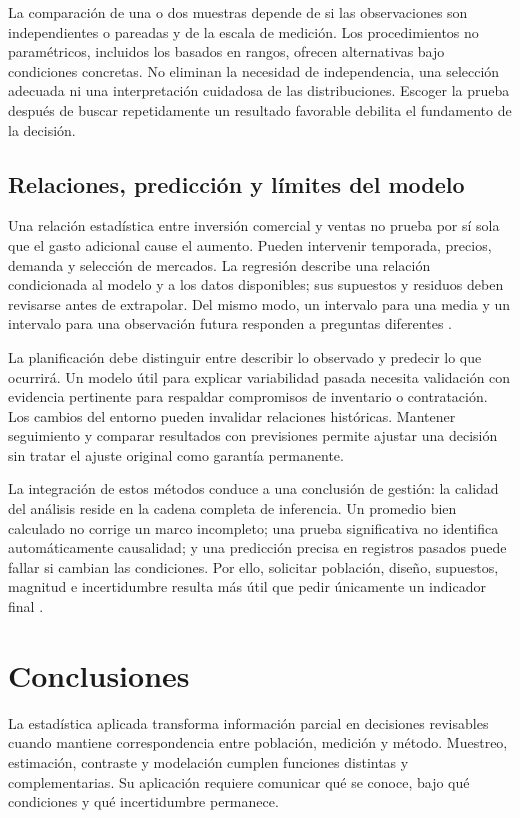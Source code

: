 \documentclass[
	spanish,
	letterpaper, oneside
]{article}
\begin{document}
La comparación de una o dos muestras depende de si las observaciones son independientes o pareadas y de la escala de medición. Los procedimientos no paramétricos, incluidos los basados en rangos, ofrecen alternativas bajo condiciones concretas. No eliminan la necesidad de independencia, una selección adecuada ni una interpretación cuidadosa de las distribuciones. Escoger la prueba después de buscar repetidamente un resultado favorable debilita el fundamento de la decisión.

\subsection{Relaciones, predicción y límites del modelo}
Una relación estadística entre inversión comercial y ventas no prueba por sí sola que el gasto adicional cause el aumento. Pueden intervenir temporada, precios, demanda y selección de mercados. La regresión describe una relación condicionada al modelo y a los datos disponibles; sus supuestos y residuos deben revisarse antes de extrapolar. Del mismo modo, un intervalo para una media y un intervalo para una observación futura responden a preguntas diferentes \citep{nistHandbook}.

La planificación debe distinguir entre describir lo observado y predecir lo que ocurrirá. Un modelo útil para explicar variabilidad pasada necesita validación con evidencia pertinente para respaldar compromisos de inventario o contratación. Los cambios del entorno pueden invalidar relaciones históricas. Mantener seguimiento y comparar resultados con previsiones permite ajustar una decisión sin tratar el ajuste original como garantía permanente.

La integración de estos métodos conduce a una conclusión de gestión: la calidad del análisis reside en la cadena completa de inferencia. Un promedio bien calculado no corrige un marco incompleto; una prueba significativa no identifica automáticamente causalidad; y una predicción precisa en registros pasados puede fallar si cambian las condiciones. Por ello, solicitar población, diseño, supuestos, magnitud e incertidumbre resulta más útil que pedir únicamente un indicador final \citep{holmesBusiness2023,nistHandbook,bradley2021}.

\section{Conclusiones}
La estadística aplicada transforma información parcial en decisiones revisables cuando mantiene correspondencia entre población, medición y método. Muestreo, estimación, contraste y modelación cumplen funciones distintas y complementarias. Su aplicación requiere comunicar qué se conoce, bajo qué condiciones y qué incertidumbre permanece.
\end{document}
